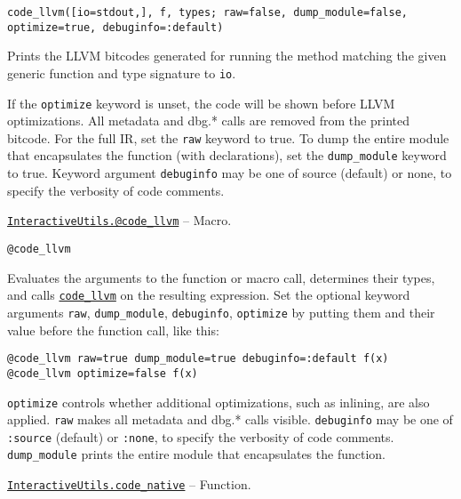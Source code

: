 \begin{adjustwidth}{2em}{0pt}


\begin{verbatim}
code_llvm([io=stdout,], f, types; raw=false, dump_module=false, optimize=true, debuginfo=:default)
\end{verbatim}

Prints the LLVM bitcodes generated for running the method matching the given generic function and type signature to \texttt{io}.

If the \texttt{optimize} keyword is unset, the code will be shown before LLVM optimizations. All metadata and dbg.* calls are removed from the printed bitcode. For the full IR, set the \texttt{raw} keyword to true. To dump the entire module that encapsulates the function (with declarations), set the \texttt{dump\_module} keyword to true. Keyword argument \texttt{debuginfo} may be one of source (default) or none, to specify the verbosity of code comments.



\end{adjustwidth}
\hypertarget{18039596607712979441}{} 
\hyperlink{18039596607712979441}{\texttt{InteractiveUtils.@code\_llvm}}  -- {Macro.}

\begin{adjustwidth}{2em}{0pt}


\begin{verbatim}
@code_llvm
\end{verbatim}

Evaluates the arguments to the function or macro call, determines their types, and calls \hyperlink{1749471484368489435}{\texttt{code\_llvm}} on the resulting expression. Set the optional keyword arguments \texttt{raw}, \texttt{dump\_module}, \texttt{debuginfo}, \texttt{optimize} by putting them and their value before the function call, like this:


\begin{lstlisting}
@code_llvm raw=true dump_module=true debuginfo=:default f(x)
@code_llvm optimize=false f(x)
\end{lstlisting}

\texttt{optimize} controls whether additional optimizations, such as inlining, are also applied. \texttt{raw} makes all metadata and dbg.* calls visible. \texttt{debuginfo} may be one of \texttt{:source} (default) or \texttt{:none},  to specify the verbosity of code comments. \texttt{dump\_module} prints the entire module that encapsulates the function.



\end{adjustwidth}
\hypertarget{2534314152947301270}{} 
\hyperlink{2534314152947301270}{\texttt{InteractiveUtils.code\_native}}  -- {Function.}

